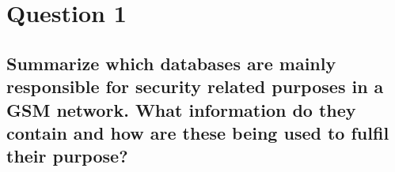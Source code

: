 \documentclass{report}
\begin{document}
	\section{Question 1}
	\startsection
		\renewcommand{\thesubsection}{\thesection.\Alph{subsection}}
		\subsection{Summarize which databases are mainly responsible for security related purposes in a GSM network. What information do they contain and how are these being used to fulfil their purpose?}
		\startsubsection
		\closesection
	\closesection
\end{document}
